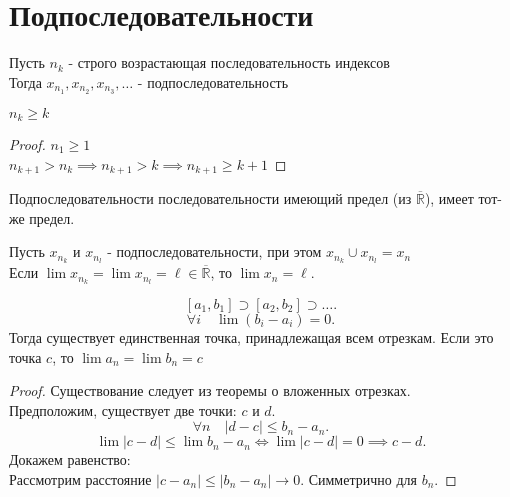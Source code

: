 \documentclass[11pt, oneside]{article}   	%
\begin{document}
\section{Подпоследовательности}
    \begin{definition}
        Пусть $n_k$ - строго возрастающая последовательность индексов\\
        Тогда $x_{n_1}, x_{n_2}, x_{n_3}, \ldots$ - подпоследовательность\\
    \end{definition}
    \begin{dlemma}
        $n_k \ge k$\\
        \begin{proof}
            $n_1 \ge 1$\\
            $n_{k+1} > n_k \implies n_{k+1} > k \implies n_{k+1} \ge k+1$
        \end{proof}
    \end{dlemma}
    \begin{dlemma}
        Подпоследовательности последовательности имеющий предел (из $\overline{\mathbb{R}}$), имеет тот-же предел.
    \end{dlemma}
    \begin{dlemma}
        Пусть $x_{n_k}$ и $x_{n_l}$ - подпоследовательности, при этом $x_{n_k} \cup x_{n_l} = x_n$ \\
        Если $\lim x_{n_k} = \lim x_{n_l} = \ell\in \overline{\mathbb{R}}$, то $\lim x_n = \ell$.
    \end{dlemma}
    \begin{theorem}
        \[ \left[a_1, b_1\right] \supset \left[a_2,b_2\right] \supset \ldots.\]
        \[ \forall{i}\quad \lim (b_i - a_i) = 0 .\] 
        Тогда существует единственная точка, принадлежащая всем отрезкам. Если это точка $c$, то  $\lim a_n = \lim b_n = c$
         \begin{proof}
            Существование следует из теоремы о вложенных отрезках.\\
            Предположим, существует две точки: $c$ и  $d$.
             \[ \forall{n}\quad |d-c| \le b_n - a_n .\]
             \[ \lim |c-d| \le \lim b_n-a_n \iff \lim |c-d| = 0 \implies c-d .\] 
             Докажем равенство:\\
             Рассмотрим расстояние $|c-a_n| \le  |b_n-a_n| \to 0$. Симметрично для $b_n$.
        \end{proof}
    \end{theorem}
\end{document}
